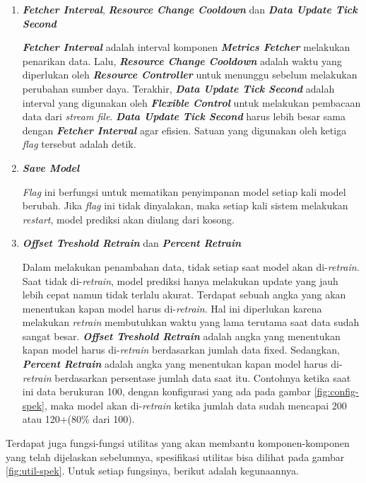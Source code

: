\begin{enumerate}
    \item \textbf{\textit{Fetcher Interval}}, \textbf{\textit{Resource Change Cooldown}} dan \textbf{\textit{Data Update Tick Second}}
    
    \textbf{\textit{Fetcher Interval}} adalah interval komponen \textbf{\textit{Metrics Fetcher}} melakukan penarikan data. Lalu, \textbf{\textit{Resource Change Cooldown}} adalah waktu yang diperlukan oleh \textbf{\textit{Resource Controller}} untuk menunggu sebelum melakukan perubahan sumber daya. Terakhir, \textbf{\textit{Data Update Tick Second}} adalah interval yang digunakan oleh \textbf{\textit{Flexible Control}} untuk melakukan pembacaan data dari \textit{stream file}. \textbf{\textit{Data Update Tick Second}} harus lebih besar sama dengan \textbf{\textit{Fetcher Interval}} agar efisien. Satuan yang digunakan oleh ketiga \textit{flag} tersebut adalah detik.

    \item \textbf{\textit{Save Model}}
    
    \textit{Flag} ini berfungsi untuk mematikan penyimpanan model setiap kali model berubah. Jika \textit{flag} ini tidak dinyalakan, maka setiap kali sistem melakukan \textit{restart}, model prediksi akan diulang dari kosong.

    \item \textbf{\textit{Offset Treshold Retrain}} dan \textbf{\textit{Percent Retrain}}
    
    Dalam melakukan penambahan data, tidak setiap saat model akan di-\textit{retrain}. Saat tidak di-\textit{retrain}, model prediksi hanya melakukan update yang jauh lebih cepat namun tidak terlalu akurat. Terdapat sebuah angka yang akan menentukan kapan model harus di-\textit{retrain}. Hal ini diperlukan karena melakukan \textit{retrain} membutuhkan waktu yang lama terutama saat data sudah sangat besar. \textbf{\textit{Offset Treshold Retrain}} adalah angka yang menentukan kapan model harus di-\textit{retrain} berdasarkan jumlah data fixed. Sedangkan, \textbf{\textit{Percent Retrain}} adalah angka yang menentukan kapan model harus di-\textit{retrain} berdasarkan persentase jumlah data saat itu. Contohnya ketika saat ini data berukuran 100, dengan konfigurasi yang ada pada gambar \ref{fig:config-spek}, maka model akan di-\textit{retrain} ketika jumlah data sudah mencapai 200 atau 120+(80\% dari 100).
\end{enumerate}

Terdapat juga fungsi-fungsi utilitas yang akan membantu komponen-komponen yang telah dijelaskan sebelumnya, spesifikasi utilitas bisa dilihat pada gambar \ref{fig:util-spek}. Untuk setiap fungsinya, berikut adalah kegunaannya.

